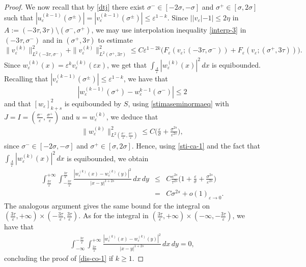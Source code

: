 \documentclass{article}
\newcommand{\e}{\varepsilon}
\begin{document}
\begin{proof}
We now recall that by  \eqref{dtj} there exist $\sigma^-\in[-2\sigma,-\sigma]$ and $
\sigma^+\in[\sigma,2\sigma]$ such that $|u_\e^{(k-1)}(\sigma^{\pm})|=|v_\e^{(k-1)}(\sigma^{\pm})|\leq \e^{1-k}$. 
Since $||v_\e|-1|\leq 2\eta$ in $A:=(-3\tau,3\tau)\setminus (\sigma^-,\sigma^+)$, we may use  interpolation inequality \eqref{interp-3} in $(-3\tau,\sigma^-)$ and in $(\sigma^+, 3\tau)$
 to estimate 
\begin{equation*}%
\|v_\e^{(k)}\|^2_{L^2(-3\tau,\sigma^-)}+\|v_\e^{(k)}\|^2_{L^2(\sigma^+, 3\tau)}\leq C\e^{1-2k} \big(F_{\e}(v_\e;(-3\tau,\sigma^-))+F_{\e}(v_\e;(\sigma^+, 3\tau))\big).
\end{equation*}
Since $w_\e^{(k)}(x)=\e^{k}v_\e^{(k)}(\e x)$, we get that $\int_{\frac{A}{\e}} |w_\e^{(k)}(x)|^2\, dx$ is equibounded. 
Recalling that 
$|v_\e^{(k-1)}(\sigma^{\pm})|\leq \e^{1-k}$, we  have that
$$|w_\e^{(k-1)}(\sigma^+)-w_\e^{k-1}(\sigma^-)|\leq 2$$ and that $[w_\e]^2_{k+s}$ is equibounded by $S$, using \eqref{stimaseminormaeq} with $J=I=(\frac{\sigma^-}{\e},\frac{\sigma^+}{\e})$ and $u=w_\e^{(k)}$, we deduce that 
\begin{eqnarray*}
\|w_\e^{(k)}\|^2_{L^2(\frac{\sigma^-}{\e},\frac{\sigma^+}{\e})}\leq C\Big(\frac{\e}{\sigma} + \frac{\sigma^{2s}}{\e^{2s}}\Big), 
\end{eqnarray*}
since $\sigma^-\in[-2\sigma,-\sigma]$ and $
\sigma^+\in[\sigma,2\sigma]$. 
Hence, using \eqref{sti-ca-1} and the fact that $\int_{\frac{A}{\e}} |w_\e^{(k)}(x)|^2\, dx$ is equibounded, we obtain 
\begin{eqnarray*}
\int_{\frac{3\tau}{\e}}^{+\infty}\int_{-\frac{3\tau}{\e}}^{\frac{3\tau}{\e}} \frac{|w_\e^{(k)}(x)-w_\e^{(k)}(y)|^2}{|x-y|^{1+2s}}\, dx\, dy
&\leq&C \frac{\e^{2s}}{\tau^{2s}} \Big(1+\frac{\e}{\sigma}+\frac{\sigma^{2s}}{\e^{2s}}\Big)
\\
&=&C\sigma^{2s}+o(1)_{\e\to 0}.
\end{eqnarray*} 
The analogous argument gives the same bound for the integral on $(\frac{3\tau}{\e},+\infty)\times (-\frac{3\tau}{\e},\frac{3\tau}{\e})$. 
As for the integral in $(\frac{3\tau}{\e},+\infty)\times (-\infty, -\frac{3\tau}{\e})$, we have that 
\begin{eqnarray*}
\int_{-\infty}^{-\frac{3\tau}{\e}} \int_{\frac{3\tau}{\e}}^{+\infty}  \frac{|w_\e^{(k)}(x)-w_\e^{(k)}(y)|^2}{|x-y|^{1+2s}}\, dx\, dy=0, 
\end{eqnarray*}
concluding the proof of \eqref{dis-co-1} if $k\ge 1$. 



\end{proof}
\end{document}
